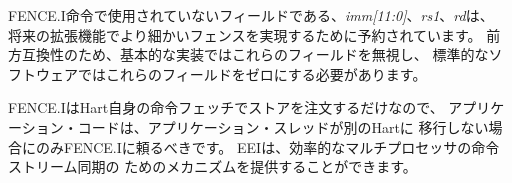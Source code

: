 \begin{comment}
The unused fields in the FENCE.I instruction, {\em imm[11:0]}, {\em rs1}, and
{\em rd}, are reserved for finer-grain fences in future extensions.  For
forward compatibility, base implementations shall ignore these fields, and
standard software shall zero these fields.
\end{comment}

FENCE.I命令で使用されていないフィールドである、{\em imm[11:0]}、{\em rs1}、{\em rd}は、
将来の拡張機能でより細かいフェンスを実現するために予約されています。 
前方互換性のため、基本的な実装ではこれらのフィールドを無視し、
標準的なソフトウェアではこれらのフィールドをゼロにする必要があります。

\begin{commentary}
\begin{comment}
Because FENCE.I only orders stores with a hart's own instruction
fetches, application code should only rely upon FENCE.I if the
application thread will not be migrated to a different hart.  The EEI
can provide mechanisms for efficient multiprocessor instruction-stream
synchronization.
\end{comment}
FENCE.IはHart自身の命令フェッチでストアを注文するだけなので、
アプリケーション・コードは、アプリケーション・スレッドが別のHartに
移行しない場合にのみFENCE.Iに頼るべきです。 
EEIは、効率的なマルチプロセッサの命令ストリーム同期の
ためのメカニズムを提供することができます。
\end{commentary}


